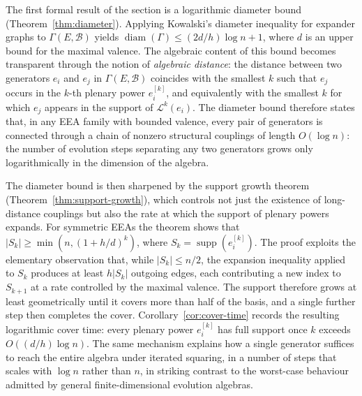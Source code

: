 \documentclass[12pt,a4paper]{amsart}
\theoremstyle{definition}
\DeclareMathOperator{\diam}{diam}
\DeclareMathOperator{\supp}{supp}
\newcommand{\EA}{E}          %
\newcommand{\natbasis}{\mathcal{B}}  %
\newcommand{\evop}{\mathcal{L}} %
\begin{document}
\medskip
The first formal result of the section is a logarithmic diameter
bound (Theorem~\ref{thm:diameter}).  Applying Kowalski's diameter
inequality for expander graphs to $\varGamma(\EA,\natbasis)$ yields
$\diam(\varGamma)\le (2d/h)\log n+1$, where $d$ is an upper bound for
the maximal valence.  The algebraic content of this bound becomes
transparent through the notion of \emph{algebraic distance}: the
distance between two generators $e_i$ and $e_j$ in $\varGamma(\EA,
\natbasis)$ coincides with the smallest $k$ such that $e_j$ occurs in
the $k$-th plenary power $e_i^{[k]}$, and equivalently with the
smallest $k$ for which $e_j$ appears in the support of $\evop^k(e_i)$.
The diameter bound therefore states that, in any EEA family with
bounded valence, every pair of generators is connected through a chain
of nonzero structural couplings of length $O(\log n)$: the number of
evolution steps separating any two generators grows only
logarithmically in the dimension of the algebra.

\medskip
The diameter bound is then sharpened by the support growth theorem
(Theorem~\ref{thm:support-growth}), which controls not just the
existence of long-distance couplings but also the rate at which the
support of plenary powers expands.  For symmetric EEAs the theorem
shows that $|S_k|\ge\min(n,(1+h/d)^k)$, where
$S_k=\supp(e_i^{[k]})$.  The proof exploits the elementary observation
that, while $|S_k|\le n/2$, the expansion inequality applied to $S_k$
produces at least $h|S_k|$ outgoing edges, each contributing a new
index to $S_{k+1}$ at a rate controlled by the maximal valence.  The
support therefore grows at least geometrically until it covers more
than half of the basis, and a single further step then completes the
cover.  Corollary~\ref{cor:cover-time} records the resulting
logarithmic cover time: every plenary power $e_i^{[k]}$ has full
support once $k$ exceeds $O((d/h)\log n)$.  The same mechanism
explains how a single generator suffices to reach the entire algebra
under iterated squaring, in a number of steps that scales with $\log
n$ rather than $n$, in striking contrast to the worst-case behaviour
admitted by general finite-dimensional evolution algebras.
\end{document}
